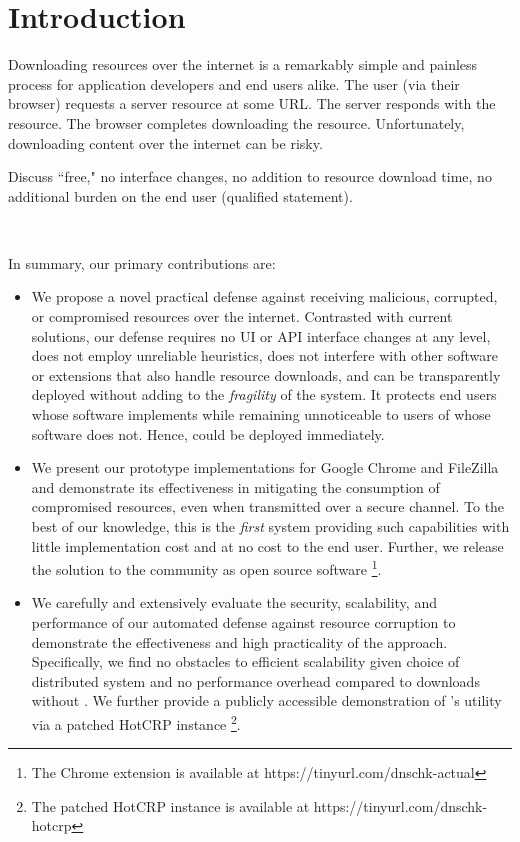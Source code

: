 \section{Introduction} \label{sec:introduction}

Downloading resources over the internet is a remarkably simple and painless
process for application developers and end users alike. The user (via their
browser) requests a server resource at some URL. The server responds with the
resource. The browser completes downloading the resource. Unfortunately,
downloading content over the internet can be risky.


Discuss ``free," \ie no interface changes, no addition to resource download
time, no additional burden on the end user (qualified statement).

~\cite{DNSSEC}

In summary, our primary contributions are:

\begin{itemize}

  \item We propose a novel practical defense against receiving malicious,
  corrupted, or compromised resources over the internet. Contrasted with current
  solutions, our defense requires no UI or API interface changes at any level,
  does not employ unreliable heuristics, does not interfere with other software
  or extensions that also handle resource downloads, and can be transparently
  deployed without adding to the \textit{fragility} of the system. It protects
  end users whose software implements \SYSTEM{} while remaining unnoticeable to
  users of whose software does not. Hence, \SYSTEM{} could be deployed
  immediately.

  \item We present our prototype \SYSTEM{} implementations for Google Chrome and
  FileZilla and demonstrate its effectiveness in mitigating the consumption of
  compromised resources, even when transmitted over a secure channel. To the
  best of our knowledge, this is the \emph{first} system providing such
  capabilities with little implementation cost and at no cost to the end user.
  Further, we release the \SYSTEM{} solution to the community as open source
  software \footnote{The Chrome extension is available at
  https://tinyurl.com/dnschk-actual}.

  \item We carefully and extensively evaluate the security, scalability, and
  performance of our automated defense against resource corruption to
  demonstrate the effectiveness and high practicality of the \SYSTEM{} approach.
  Specifically, we find no obstacles to efficient scalability given choice of
  distributed system and no performance overhead compared to downloads without
  \SYSTEM{}. We further provide a publicly accessible demonstration of
  \SYSTEM{}'s utility via a patched HotCRP instance \footnote{The patched HotCRP
  instance is available at https://tinyurl.com/dnschk-hotcrp}.

\end{itemize}
